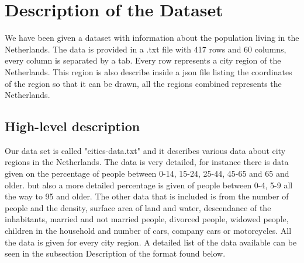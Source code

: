 \documentclass[a4paper,twoside,11pt]{article}
\begin{document}
\section{Description of the Dataset}
We have been given a dataset with information about the population living in the Netherlands. The data is provided in a .txt file with 417 rows and 60 columns, every column is separated by a tab. Every row represents a city region of the Netherlands. This region is also describe inside a json file listing the coordinates of the region so that it can be drawn, all the regions combined represents the Netherlands.
\subsection{High-level description}
Our data set is called "cities-data.txt" and it describes various data about city regions in the Netherlands. The data is very detailed, for instance there is data given on the percentage of people between 0-14, 15-24, 25-44, 45-65 and 65 and older. but also a more detailed percentage is given of people between 0-4, 5-9 all the way to 95 and older. \newline
The other data that is included is from the number of people and the density, surface area of land and water, descendance of the inhabitants, married and not married people, divorced people, widowed people, children in the household and number of cars, company cars or motorcycles. All the data is given for every city region. A detailed list of the data available can be seen in the subsection Description of the format found below. \newline
\end{document}
